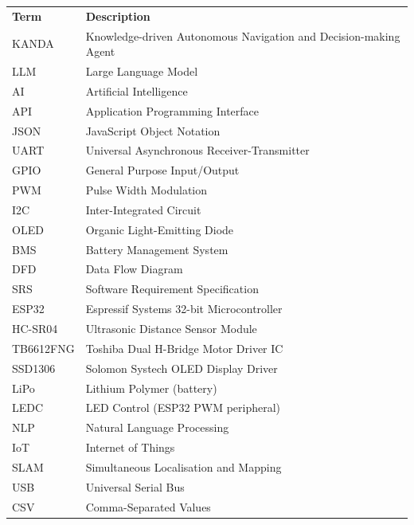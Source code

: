     \begin{longtable}{@{}l@{\hspace{1em}:\hspace{1em}}l@{}}
    \textbf{Term} & \textbf{Description} \\[4pt]
    KANDA  & Knowledge-driven Autonomous Navigation and Decision-making Agent \\
        LLM    & Large Language Model \\
        AI     & Artificial Intelligence \\
        API    & Application Programming Interface \\
        JSON   & JavaScript Object Notation \\
        UART   & Universal Asynchronous Receiver-Transmitter \\
        GPIO   & General Purpose Input/Output \\
        PWM    & Pulse Width Modulation \\
        I2C    & Inter-Integrated Circuit \\
        OLED   & Organic Light-Emitting Diode \\
        BMS    & Battery Management System \\
        DFD    & Data Flow Diagram \\
        SRS    & Software Requirement Specification \\
        ESP32  & Espressif Systems 32-bit Microcontroller \\
        HC-SR04 & Ultrasonic Distance Sensor Module \\
        TB6612FNG & Toshiba Dual H-Bridge Motor Driver IC \\
        SSD1306 & Solomon Systech OLED Display Driver \\
        LiPo   & Lithium Polymer (battery) \\
        LEDC   & LED Control (ESP32 PWM peripheral) \\
        NLP    & Natural Language Processing \\
        IoT    & Internet of Things \\
        SLAM   & Simultaneous Localisation and Mapping \\
        USB    & Universal Serial Bus \\
        CSV    & Comma-Separated Values \\
        \end{longtable}